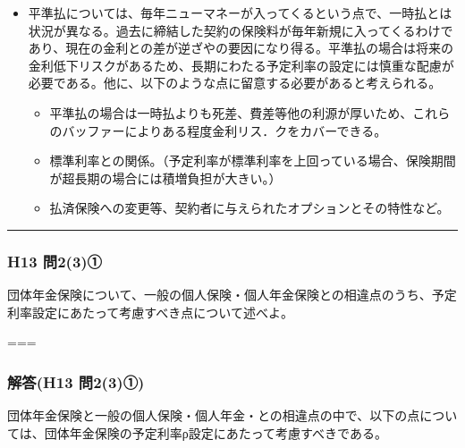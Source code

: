 \documentclass[
]{article}
\providecommand{\tightlist}{%
  \setlength{\itemsep}{0pt}\setlength{\parskip}{0pt}}
\begin{document}
\begin{itemize}
  \begin{itemize}
  \tightlist
  \item
    平準払については、毎年ニューマネーが入ってくるという点で、一時払とは状況が異なる。過去に締結した契約の保険料が毎年新規に入ってくるわけであり、現在の金利との差が逆ざやの要因になり得る。平準払の場合は将来の金利低下リスクがあるため、長期にわたる予定利率の設定には慎重な配慮が必要である。他に、以下のような点に留意する必要があると考えられる。

    \begin{itemize}
    \tightlist
    \item
      平準払の場合は一時払よりも死差、費差等他の利源が厚いため、これらのバッファーによりある程度金利リス．クをカバーできる。
    \item
      標準利率との関係。（予定利率が標準利率を上回っている場合、保険期間が超長期の場合には積増負担が大きい。）
    \item
      払済保険への変更等、契約者に与えられたオプションとその特性など。
    \end{itemize}
  \end{itemize}
\end{itemize}

\begin{center}\rule{0.5\linewidth}{0.5pt}\end{center}

\hypertarget{h13-ux554f23ux2460}{%
\subsubsection{H13 問2(3)①}\label{h13-ux554f23ux2460}}

団体年金保険について、一般の個人保険・個人年金保険との相違点のうち、予定利率設定にあたって考慮すべき点について述べよ。

===

\hypertarget{ux89e3ux7b54h13-ux554f23ux2460}{%
\subsubsection{解答(H13 問2(3)①)}\label{ux89e3ux7b54h13-ux554f23ux2460}}

団体年金保険と一般の個人保険・個人年金・との相違点の中で、以下の点については、団体年金保険の予定利率ρ設定にあたって考慮すべきである。
\end{document}
